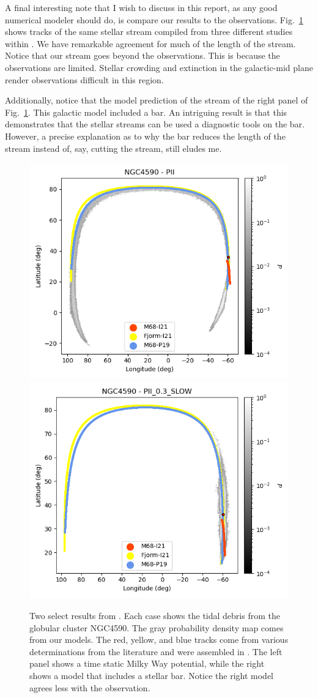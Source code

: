 A final interesting note that I wish to discuss in this report, as any good numerical modeler should do, is compare our results to the observations. Fig.~\ref{fig:NGC4590} shows tracks of the same stellar stream compiled from three different studies within \citet{2023MNRAS.520.5225M}. We have remarkable agreement for much of the length of the stream. Notice that our stream goes beyond the observations. This is because the observations are limited. Stellar crowding and extinction in the galactic-mid plane render observations difficult in this region. 

Additionally, notice that the model prediction of the stream of the right panel of Fig.~\ref{fig:NGC4590}. This galactic model included a bar. An intriguing result is that this demonstrates that the stellar streams can be used a diagnostic tools on the bar. However, a precise explanation as to why the bar reduces the length of the stream instead of, say, cutting the stream, still eludes me. 
\begin{figure}
    \centering
    \includegraphics[width=0.45\linewidth]{images/galstream-NGC4590-l-b-pii.png}
    \includegraphics[width=0.45\linewidth]{images/galstream-NGC4590-l-b.png}
    \caption{Two select results from \citep{2023A&A...673A..44F}. Each case shows the tidal debris from the globular cluster NGC4590. The gray probability density map comes from our models. The red, yellow, and blue tracks come from various determinations from the literature and were assembled in \citet{2023MNRAS.520.5225M}. The left panel shows a time static Milky Way potential, while the right shows a model that includes a stellar bar. Notice the right model agrees less with the observation.}
    \label{fig:NGC4590}
\end{figure}


